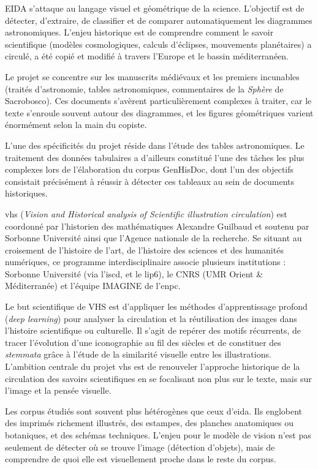 \begin{description}
EIDA s'attaque au langage visuel et géométrique de la science. L'objectif est de détecter, d'extraire, de classifier et de comparer automatiquement les diagrammes astronomiques. L'enjeu historique est de comprendre comment le savoir scientifique (modèles cosmologiques, calculs d'éclipses, mouvements planétaires) a circulé, a été copié et modifié à travers l'Europe et le bassin méditerranéen.

Le projet se concentre sur les manuscrits médiévaux et les premiers incunables (traités d'astronomie, tables astronomiques, commentaires de la \textit{Sphère} de Sacrobosco). Ces documents s'avèrent particulièrement complexes à traiter, car le texte s'enroule souvent autour des diagrammes, et les figures géométriques varient énormément selon la main du copiste.

L'une des spécificités du projet réside dans l'étude des tables astronomiques. Le traitement des données tabulaires a d'ailleurs constitué l'une des tâches les plus complexes lors de l'élaboration du corpus GenHisDoc, dont l'un des objectifs consistait précisément à réussir à détecter ces tableaux au sein de documents historiques.

\item[Le projet VHS :] \gls{vhs} (\textit{Vision and Historical analysis of Scientific illustration circulation}) est coordonné par l'historien des mathématiques Alexandre Guilbaud et soutenu par Sorbonne Université ainsi que l'Agence nationale de la recherche. Se situant au croisement de l'histoire de l'art, de l'histoire des sciences et des humanités numériques, ce programme interdisciplinaire associe plusieurs institutions : Sorbonne Université (via l'\gls{iscd}, et le \gls{lip6}), le CNRS (UMR Orient \& Méditerranée) et l'équipe IMAGINE de l'\gls{enpc}.

Le but scientifique de VHS est d'appliquer les méthodes d'apprentissage profond (\textit{deep learning}) pour analyser la circulation et la réutilisation des images dans l'histoire scientifique ou culturelle. Il s'agit de repérer des motifs récurrents, de tracer l'évolution d'une iconographie au fil des siècles et de constituer des \textit{stemmata} grâce à l'étude de la similarité visuelle entre les illustrations. L'ambition centrale du projet \gls{vhs} est de renouveler l'approche historique de la circulation des savoirs scientifiques en se focalisant non plus sur le texte, mais sur l'image et la pensée visuelle. 

Les corpus étudiés sont souvent plus hétérogènes que ceux d'\gls{eida}. Ils englobent des imprimés richement illustrés, des estampes, des planches anatomiques ou botaniques, et des schémas techniques. L'enjeu pour le modèle de vision n'est pas seulement de détecter \og où \fg{} se trouve l'image (détection d'objets), mais de comprendre \og de quoi \fg{} elle est visuellement proche dans le reste du corpus.


\end{description}

